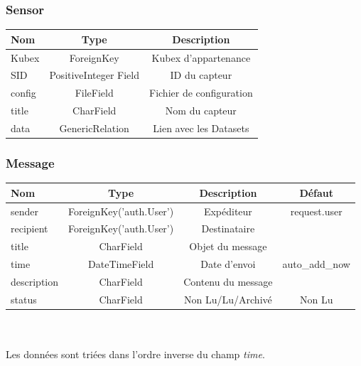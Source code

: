 \documentclass[a4paper]{report}
\begin{document}
\subsubsection{Sensor}
\begin{tabular}{|l|c|c|}
	\hline
	\textbf{Nom} & \textbf{Type} & \textbf{Description} \\
	\hline
	Kubex & ForeignKey & Kubex d'appartenance \\
	SID & PositiveInteger Field & ID du capteur \\
	config & FileField & Fichier de configuration \\
	title & CharField & Nom du capteur \\
	data & GenericRelation & Lien avec les Datasets \\
	\hline
\end{tabular}

\subsubsection{Message}
\begin{tabular}{|l|c|c|c|}
	\hline
	\textbf{Nom} & \textbf{Type} & \textbf{Description} & \textbf{Défaut}\\
	\hline
	sender & ForeignKey('auth.User') & Expéditeur & request.user \\
	recipient & ForeignKey('auth.User') & Destinataire & \\
	title & CharField & Objet du message & \\
	time & DateTimeField & Date d'envoi & auto\_add\_now \\
	description & CharField & Contenu du message & \\
	status & CharField & Non Lu/Lu/Archivé & Non Lu\\
	\hline
\end{tabular}
~\\~\\
Les données sont triées dans l'ordre inverse du champ \emph{time}.
\end{document}
